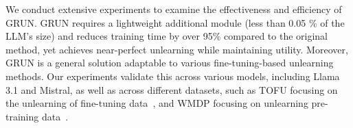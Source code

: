 

{We conduct extensive experiments to examine the effectiveness and efficiency of GRUN.} GRUN requires a lightweight additional module (less than 0.05 \% of the LLM’s size) and reduces training time by over 95\% compared to the original method, yet achieves near-perfect unlearning while maintaining utility. Moreover, GRUN is a general solution adaptable to various fine-tuning-based unlearning methods. Our experiments validate this across various models, including Llama 3.1 and Mistral, as well as across different datasets, such as TOFU focusing on the unlearning of fine-tuning data~\cite{maini2024tofu}, and WMDP focusing on unlearning pre-training data~\cite{liwmdp}.





